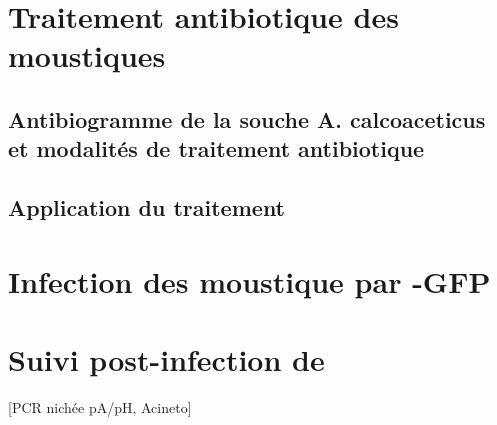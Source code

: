 \section{Traitement antibiotique des moustiques}

\subsection{Antibiogramme de la souche A. calcoaceticus et modalités de traitement antibiotique}

\subsection{Application du traitement}

\section{Infection des moustique par -GFP}

\section{Suivi post-infection de }

[PCR nichée pA/pH, Acineto]